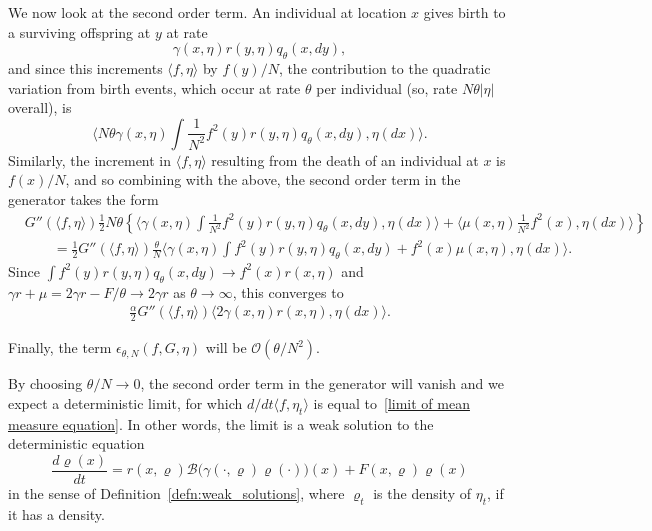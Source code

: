 \documentclass[12pt]{article}
\newcommand{\bigO}{\mathcal{O}}
\newcommand{\DG}{\mathcal{B}}  %
\begin{document}
We now look at the second order term.
An individual at location $x$ gives birth 
to a surviving offspring at $y$ at rate
$$
\gamma(x,\eta) r(y,\eta) q_{\theta}(x, dy) ,
$$
and since this increments $\langle f, \eta \rangle$ by $f(y) / N$,
the contribution to the quadratic variation from birth events,
which occur at rate $\theta$ per individual 
(so, rate $N\theta |\eta|$ overall), is
$$
\langle
    N \theta \gamma(x,\eta)
    \int \frac{1}{N^2} f^2(y) r(y,\eta)
    q_\theta(x,dy) 
    , \eta(dx)
\rangle .
$$
Similarly, the increment in $\langle f, \eta\rangle$ resulting from 
the death of an individual at $x$ is $f(x)/N$, and so combining with the 
above, the second order term in the generator takes the form
\begin{align*}
& G''(\langle f,\eta\rangle)
\frac{1}{2} N \theta
\left\{
    \langle
        \gamma(x,\eta)
        \int \frac{1}{N^2}f^2(y)r(y,\eta)q_\theta(x,dy) 
    , \eta(dx)\rangle
    +
    \langle
        \mu(x,\eta)\frac{1}{N^2}f^2(x) 
    ,\eta(dx)\rangle
\right\} \\
&\qquad
= \frac{1}{2} G''(\langle f, \eta \rangle)
    \frac{\theta}{N}
    \langle
        \gamma(x, \eta) \int f^2(y) r(y, \eta) q_\theta(x, dy) + f^2(x) \mu(x, \eta),
        \eta(dx)
    \rangle .
\end{align*}
Since $\int f^2(y) r(y, \eta) q_\theta(x, dy) \to f^2(x) r(x, \eta)$
and $\gamma r + \mu = 2 \gamma r - F / \theta \to 2 \gamma r$
as $\theta \to \infty$,
this converges to
\begin{align*}
\frac{\alpha}{2} G''(\langle f, \eta \rangle)
    \langle
        2 \gamma(x, \eta) r(x, \eta),
        \eta(dx)
    \rangle .
\end{align*}

Finally, the term $\epsilon_{\theta,N}(f, G, \eta)$ will be 
$\bigO(\theta/N^2)$.

By choosing $\theta/N \rightarrow 0$, the second order term in the generator 
will vanish and we expect a deterministic limit,
for which $d/dt \langle f, \eta_t \rangle$ is equal to~\eqref{limit of mean measure equation}.
In other words, the limit is a weak solution to the deterministic equation
\begin{equation}
\label{deterministic limit}
\frac{d\varrho(x)}{dt}
=
    r(x,\varrho)
    \DG\big(
        \gamma(\cdot,\varrho) \varrho(\cdot)
    \big)(x)
    + F(x, \varrho) \varrho(x) 
\end{equation}
in the sense of Definition~\ref{defn:weak_solutions},
where $\varrho_t$ is the density of $\eta_t$, if it has a density.
\end{document}
